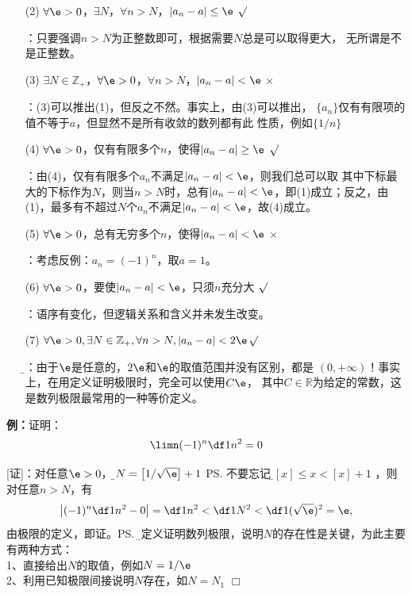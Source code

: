 \begin{enumerate}
  \setlength{\itemindent}{1cm}
  \item[(2)] $\forall\e>0$，$\exists N$，$\forall
  n>N$，$|a_n-a|\leq\e$ \hfill{$\surd$} 
  
  \quad [提示]：只要强调$n>N$为正整数即可，根据需要$N$总是可以取得更大，
  无所谓是不是正整数。
  \item[(3)] $\exists N\in\mathbb{Z}_+$，$\forall\e>0$，$\forall
  n>N$，$|a_n-a|<\e$ \hfill{$\times$}
  
  \quad [提示]：(3)可以推出(1)，但反之不然。事实上，由(3)可以推出，
  $\{a_n\}$仅有有限项的值不等于$a$，但显然不是所有收敛的数列都有此
  性质，例如$\{1/n\}$
  \item[(4)] $\forall\e>0$，仅有有限多个$n$，使得$|a_n-a|\geq\e$
  \hfill{$\surd$}
  
  \quad [提示]：由(4)，仅有有限多个$a_n$不满足$|a_n-a|<\e$，则我们总可以取
  其中下标最大的下标作为$N$，则当$n>N$时，总有$|a_n-a|<\e$，即(1)成立；反之，由
  (1)，最多有不超过$N$个$a_n$不满足$|a_n-a|<\e$，故(4)成立。
  
  \item[(5)] $\forall\e>0$，总有无穷多个$n$，使得$|a_n-a|<\e$
  \hfill{$\times$} 
  
  \quad [提示]：考虑反例：$a_n=(-1)^n$，取$a=1$。
  \item[(6)] $\forall\e>0$，要使$|a_n-a|<\e$，只须$n$充分大 \hfill{$\surd$}
  
  \quad [提示]：语序有变化，但逻辑关系和含义并未发生改变。
  \item[(7)] $\forall\e>0,\exists N\in\mathbb{Z}_+,\forall
  n>N,|a_n-a|<2\e$\hfill{$\surd$}
  
  {\quad\b\kaishu [注]：由于$\e$是任意的，$2\e$和$\e$的取值范围并没有区别，都是
  $(0,+\infty)$！事实上，在用定义证明极限时，完全可以使用$C\e$，
  其中$C\in\mathbb{R}$为给定的常数，这是数列极限最常用的一种等价定义。}
\end{enumerate}

{\bf 例：}证明：
$$\limn(-1)^n\df1{n^2}=0$$

[证]：对任意$\e>0$，{\b 令$N=\left[1/\sqrt{\e}\right]+1$}
\ps{不要忘记：\b $[x]\leq x<[x]+1$}
，则对任意$n>N$，有
$$\left|(-1)^n\df1{n^2}-0\right|=\df1{n^2}<\df1{N^2}
<\df1{(\sqrt{\e})^2}=\e,$$
由极限的定义，即证。\ps{\b 用定义证明数列极限，说明$N$的存在性是关键，为此主要有两种方式：\\
1、直接给出$N$的取值，例如$N=1/\e$\\
2、利用已知极限间接说明$N$存在，如$N=N_1$}
\hfill $\Box$

